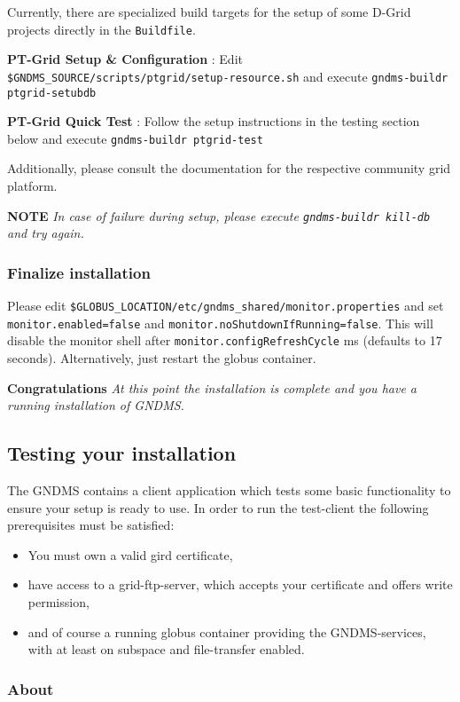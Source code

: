 \documentclass{article}
\begin{document}
Currently, there are specialized build targets for the setup of
some D-Grid projects directly in the \verb!Buildfile!.

\textbf{PT-Grid Setup \& Configuration} : Edit
\verb!$GNDMS_SOURCE/scripts/ptgrid/setup-resource.sh! and execute
\verb!gndms-buildr ptgrid-setubdb!

\textbf{PT-Grid Quick Test} : Follow the setup instructions in the
testing section below and execute \verb!gndms-buildr ptgrid-test!

Additionally, please consult the documentation for the respective
community grid platform.

\textbf{NOTE}
\emph{In case of failure during setup, please execute \texttt{gndms-buildr kill-db} and try again.}

\subsubsection{Finalize installation}

Please edit
\verb!$GLOBUS_LOCATION/etc/gndms_shared/monitor.properties! and set
\verb!monitor.enabled=false! and
\verb!monitor.noShutdownIfRunning=false!. This will disable the
monitor shell after \verb!monitor.configRefreshCycle! ms (defaults
to 17 seconds). Alternatively, just restart the globus container.

\textbf{Congratulations}
\emph{At this point the installation is complete and you have a running installation of GNDMS.}

\subsection{Testing your installation}

The GNDMS contains a client application which tests some basic
functionality to ensure your setup is ready to use. In order to run
the test-client the following prerequisites must be satisfied:

\begin{itemize}
\item
  You must own a valid gird certificate,
\item
  have access to a grid-ftp-server, which accepts your certificate
  and offers write permission,
\item
  and of course a running globus container providing the
  GNDMS-services, with at least on subspace and file-transfer
  enabled.
\end{itemize}
\subsubsection{About}
\end{document}
